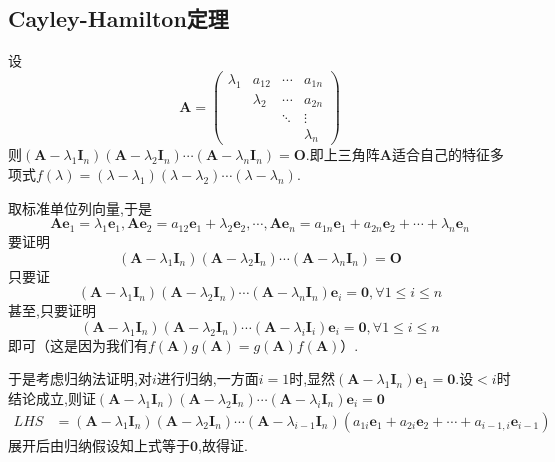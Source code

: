 \subsection{Cayley-Hamilton定理}
\begin{formal}
\begin{proposition}[简单版]\label{prop:简单版}
    设
    \[
    \bm{A}=\begin{pmatrix}
        \lambda_1&a_{12}&\cdots&a_{1n}\\
        &\lambda_2&\cdots&a_{2n}\\
        &&\ddots&\vdots\\
        &&&\lambda_n
    \end{pmatrix}
    \]则$\left(
        \bm{A}-\lambda_1\bm{I}_n
    \right)
    \left(
        \bm{A}-\lambda_2\bm{I}_n
    \right)\cdots\left(
        \bm{A}-\lambda_n\bm{I}_n
    \right)=\bm{O}.
    $即上三角阵$\bm{A}$适合自己的特征多项式$f\left(\lambda\right)=\left(\lambda-\lambda_1\right)
    \left(\lambda-\lambda_2\right)\cdots\left(\lambda-\lambda_n\right).
    $
\end{proposition}
\begin{Proof}
取标准单位列向量,于是
\[
\bm{Ae}_1=\lambda_1\bm{e}_1,\bm{Ae}_2=a_{12}\bm{e}_1+\lambda_2\bm{e}_2,\cdots,\bm{Ae}_n=a_{1n}\bm{e}_1+a_{2n}\bm{e}_2+\cdots+\lambda_n\bm{e}_n
\]要证明
\[
\left(
    \bm{A}-\lambda_1\bm{I}_n   
\right)
\left(
    \bm{A}-\lambda_2\bm{I}_n
\right)\cdots\left(
    \bm{A}-\lambda_n\bm{I}_n
\right)=\bm{O}
\]只要证
\[
\left(
    \bm{A}-\lambda_1\bm{I}_n
\right)\left(
    \bm{A}-\lambda_2\bm{I}_n
\right)
\cdots\left(
    \bm{A}-\lambda_n\bm{I}_n
\right)\bm{e}_i=\bm{0},\forall 1\leqslant i\leqslant n
\]甚至,只要证明
\[
\left(
    \bm{A}-\lambda_1\bm{I}_n
\right)\left(
    \bm{A}-\lambda_2\bm{I}_n
\right)\cdots\left(
    \bm{A}-\lambda_i\bm{I}_i
\right)\bm{e}_i=\bm{0},\forall 1\leqslant i\leqslant n
\]即可（这是因为我们有$f\left(\bm{A}\right)g\left(\bm{A}\right)=g\left(\bm{A}\right)f\left(\bm{A}\right)$）.

于是考虑归纳法证明,对$i$进行归纳,一方面$i=1$时,显然$\left(
    \bm{A}-\lambda_1\bm{I}_n
\right)\bm{e}_1=\bm{0}$.设$<i$时结论成立,则证$\left(
    \bm{A}-\lambda_1\bm{I}_n
\right)
\left(
    \bm{A}-\lambda_2\bm{I}_n
\right)\cdots\left(
    \bm{A}-\lambda_i\bm{I}_n
\right)\bm{e}_i=\bm{0}
$
\begin{align*}
    LHS &= \left(
        \bm{A}-\lambda_1\bm{I}_n
    \right)
    \left(
        \bm{A}-\lambda_2\bm{I}_n
    \right)\cdots\left(
        \bm{A}-\lambda_{i-1}\bm{I}_n
    \right)\left(
        a_{1i}\bm{e}_1+a_{2i}\bm{e}_2+\cdots+a_{i-1,i}\bm{e}_{i-1}
    \right)
\end{align*}
展开后由归纳假设知上式等于$\bm{0}$,故得证.
\end{Proof}
\end{formal}
